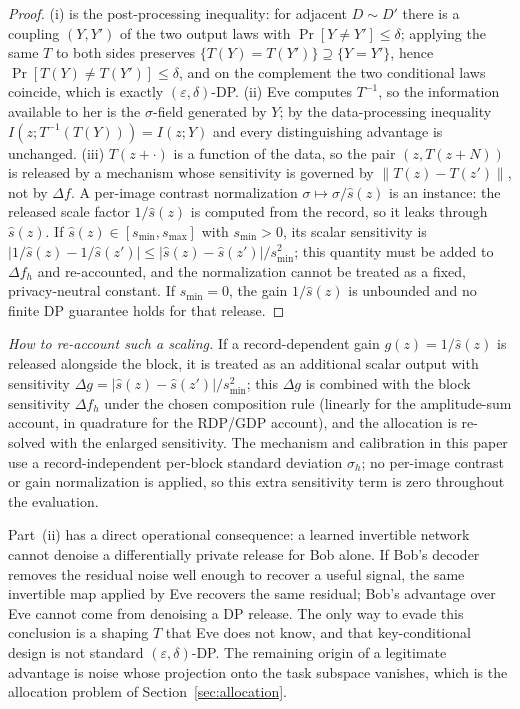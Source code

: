 \documentclass[10pt,twocolumn,letterpaper]{article}
\theoremstyle{plain}
\theoremstyle{definition}
\begin{document}
\begin{proof}
(i) is the post-processing inequality: for adjacent $D\sim D'$ there is a
coupling $(Y,Y')$ of the two output laws with $\Pr[Y\neq Y']\le\delta$;
applying the same $T$ to both sides preserves
$\{T(Y)=T(Y')\}\supseteq\{Y=Y'\}$, hence
$\Pr[T(Y)\neq T(Y')]\le\delta$, and on the complement the two conditional
laws coincide, which is exactly $(\varepsilon,\delta)$-DP.
(ii) Eve computes $T^{-1}$, so the information available to her is the
$\sigma$-field generated by $Y$; by the data-processing inequality
$I(z;T^{-1}(T(Y)))=I(z;Y)$ and every distinguishing advantage is unchanged.
(iii) $T(z+\cdot)$ is a function of the data, so the pair
$(z,T(z+N))$ is released by a mechanism whose sensitivity is governed by
$\|T(z)-T(z')\|$, not by $\Delta f$. A per-image contrast normalization
$\sigma\mapsto\sigma/\widehat{s}(z)$ is an instance: the released scale factor
$1/\widehat{s}(z)$ is computed from the record, so it leaks through
$\widehat{s}(z)$. If $\widehat{s}(z)\in[s_{\min},s_{\max}]$ with $s_{\min}>0$,
its scalar sensitivity is
$|1/\widehat{s}(z)-1/\widehat{s}(z')|\le |\widehat{s}(z)-\widehat{s}(z')|/
s_{\min}^{2}$; this quantity must be added to $\Delta f_h$ and re-accounted,
and the normalization cannot be treated as a fixed, privacy-neutral constant.
If $s_{\min}=0$, the gain $1/\widehat{s}(z)$ is unbounded and no finite DP
guarantee holds for that release.
\end{proof}

\emph{How to re-account such a scaling.} If a record-dependent gain
$g(z)=1/\widehat{s}(z)$ is released alongside the block, it is treated as an
additional scalar output with sensitivity
$\Delta g=|\widehat{s}(z)-\widehat{s}(z')|/s_{\min}^{2}$; this $\Delta g$ is
combined with the block sensitivity $\Delta f_h$ under the chosen composition
rule (linearly for the amplitude-sum account, in quadrature for the RDP/GDP
account), and the allocation is re-solved with the enlarged sensitivity. The
mechanism and calibration in this paper use a record-independent per-block
standard deviation $\sigma_h$; no per-image contrast or gain normalization is
applied, so this extra sensitivity term is zero throughout the evaluation.

Part~(ii) has a direct operational consequence: a learned
invertible network cannot denoise a differentially private release for Bob
alone. If Bob's decoder removes the residual noise well enough to recover a
useful signal, the same invertible map applied by Eve recovers the same
residual; Bob's advantage over Eve cannot come from denoising a DP release. The
only way to evade this conclusion is a shaping $T$ that Eve does not know, and
that key-conditional design is not standard $(\varepsilon,\delta)$-DP. The
remaining origin of a legitimate advantage is noise whose projection onto the
task subspace vanishes, which is the allocation problem of
Section~\ref{sec:allocation}.
\end{document}
